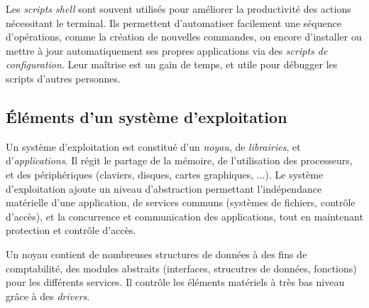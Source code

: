\documentclass[french, toc]{../cs-classes/cs-classes}
\begin{document}
Les \emph{scripts shell} sont souvent utilisés pour améliorer la productivité des actions nécessitant le terminal. Ils permettent d'automatiser facilement une séquence d'opérations, comme la création de nouvelles commandes, ou encore d'installer ou mettre à jour automatiquement ses propres applications via des \emph{scripts de configuration}. Leur maîtrise est un gain de temps, et utile pour débugger les scripts d'autres personnes.

\subsection{Éléments d'un système d'exploitation}
Un système d'exploitation est constitué d'un \emph{noyau}, de \emph{librairies}, et d'\emph{applications}. Il régit le partage de la mémoire, de l'utilisation des processeurs, et des périphériques (claviers, disques, cartes graphiques, ...). Le système d'exploitation ajoute un niveau d'abstraction permettant l'indépendance matérielle d'une application, de services communs (systèmes de fichiers, contrôle d'accès), et la concurrence et communication des applications, tout en maintenant protection et contrôle d'accès.

Un noyau contient de nombreuses structures de données à des fins de comptabilité, des modules abstraits (interfaces, strucutres de données, fonctions) pour les différents services. Il contrôle les éléments matériels à très bas niveau grâce à des \emph{drivers}. 
\end{document}
